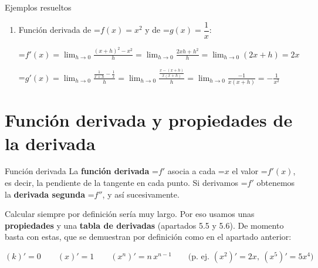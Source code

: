 \documentclass[11pt,a4paper]{article}
\newcommand{\fmm}[1]{\setbox0=\hbox{$#1$}\ifdim\wd0>\linewidth\[#1\]\else\mbox{\box0}\fi}
\begin{document}
\begin{fmex}{Ejemplos resueltos}
\begin{enumerate}[label=\textbf{\arabic*.},leftmargin=*]
            \vspace*{0.4cm}

\fmm{g'(1)=\displaystyle\lim_{h\to0}\frac{-h^2+2h}{h}=\lim_{h\to0}(-h+2)=2}
\item Función derivada de \fmm{f(x)=x^2} y de \fmm{g(x)=\dfrac1x}:
          
\vspace*{0.2cm}
            

\fmm{f'(x)=\displaystyle\lim_{h\to0}\frac{(x+h)^2-x^2}{h}=\lim_{h\to0}\frac{2xh+h^2}{h}=\lim_{h\to0}(2x+h)=2x}

            \vspace*{0.2cm}

\fmm{g'(x)=\displaystyle\lim_{h\to0}\frac{\frac{1}{x+h}-\frac1x}{h}=\lim_{h\to0}\frac{\frac{x-(x+h)}{x(x+h)}}{h}=\lim_{h\to0}\frac{-1}{x(x+h)}=-\frac{1}{x^2}}
\end{enumerate}
\end{fmex}

  
\section{Función derivada y propiedades de la derivada}\hypertarget{sec4}{}

  

  
\begin{fmdef}{Función derivada}
La \textbf{función derivada} \fmm{f'} asocia a cada \fmm{x} el valor \fmm{f'(x)}, es decir, la pendiente de la tangente en cada punto. Si derivamos \fmm{f'} obtenemos la \textbf{derivada segunda} \fmm{f''}, y así sucesivamente.

      

Calcular siempre por definición sería muy largo. Por eso usamos unas \textbf{propiedades} y una \textbf{tabla de derivadas} (apartados 5.5 y 5.6). De momento basta con estas, que se demuestran por definición como en el apartado anterior:

      
\[(k)'=0\qquad(x)'=1\qquad(x^n)'=n\,x^{n-1}\qquad\big(\text{p. ej. }(x^2)'=2x,\ (x^5)'=5x^4\big)\]

\end{fmdef}
\end{document}
